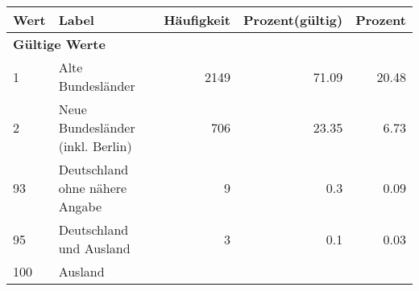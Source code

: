      \begin{longtable}{lXrrr}
     \toprule
     \textbf{Wert} & \textbf{Label} & \textbf{Häufigkeit} & \textbf{Prozent(gültig)} & \textbf{Prozent} \\
     \endhead
     \midrule
     \multicolumn{5}{l}{\textbf{Gültige Werte}}\\

     1 &
     \multicolumn{1}{X}{ Alte Bundesländer   } &


       \num{2149} &
       \num[round-mode=places,round-precision=2]{71,09} &
         \num[round-mode=places,round-precision=2]{20,48} \\

     2 &
     \multicolumn{1}{X}{ Neue Bundesländer (inkl. Berlin)   } &


       \num{706} &
       \num[round-mode=places,round-precision=2]{23,35} &
         \num[round-mode=places,round-precision=2]{6,73} \\

     93 &
     \multicolumn{1}{X}{ Deutschland ohne nähere Angabe   } &


       \num{9} &
       \num[round-mode=places,round-precision=2]{0,3} &
         \num[round-mode=places,round-precision=2]{0,09} \\

     95 &
     \multicolumn{1}{X}{ Deutschland und Ausland   } &


       \num{3} &
       \num[round-mode=places,round-precision=2]{0,1} &
         \num[round-mode=places,round-precision=2]{0,03} \\

     100 &
     \multicolumn{1}{X}{ Ausland   } &



\end{longtable}
